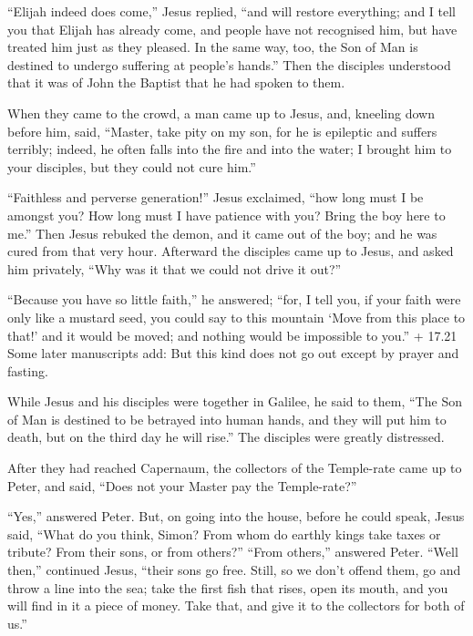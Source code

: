  ``Elijah indeed does come,'' Jesus replied, ``and will
restore everything;  and I tell you that Elijah has already
come, and people have not recognised him, but have treated him just as
they pleased. In the same way, too, the Son of Man is destined to
undergo suffering at people's hands.''  Then the disciples
understood that it was of John the Baptist that he had spoken to them.

 When they came to the crowd, a man came up to Jesus, and,
kneeling down before him, said,  ``Master, take pity on my
son, for he is epileptic and suffers terribly; indeed, he often falls
into the fire and into the water;  I brought him to your
disciples, but they could not cure him.''

 ``Faithless and perverse generation!'' Jesus exclaimed,
``how long must I be amongst you? How long must I have patience with
you? Bring the boy here to me.''  Then Jesus rebuked the
demon, and it came out of the boy; and he was cured from that very hour.
 Afterward the disciples came up to Jesus, and asked him
privately, ``Why was it that we could not drive it out?''

 ``Because you have so little faith,'' he answered; ``for,
I tell you, if your faith were only like a mustard seed, you could say
to this mountain `Move from this place to that!' and it would be moved;
and nothing would be impossible to you.''  + 17.21 Some
later manuscripts add: But this kind does not go out except by prayer
and fasting.

 While Jesus and his disciples were together in Galilee, he
said to them, ``The Son of Man is destined to be betrayed into human
hands,  and they will put him to death, but on the third
day he will rise.'' The disciples were greatly distressed.

 After they had reached Capernaum, the collectors of the
Temple-rate came up to Peter, and said, ``Does not your Master pay the
Temple-rate?''

 ``Yes,'' answered Peter. But, on going into the house,
before he could speak, Jesus said, ``What do you think, Simon? From whom
do earthly kings take taxes or tribute? From their sons, or from
others?''  ``From others,'' answered Peter. ``Well then,''
continued Jesus, ``their sons go free.  Still, so we don't
offend them, go and throw a line into the sea; take the first fish that
rises, open its mouth, and you will find in it a piece of money. Take
that, and give it to the collectors for both of us.''

